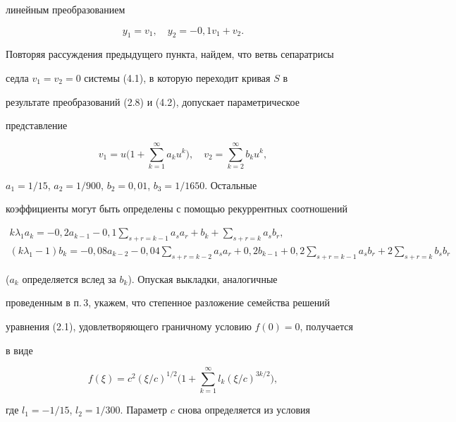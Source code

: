 линейным преобразованием 


\begin{equation} 


y_1=v_1,\quad y_2=-0{,}1v_1+v_2. 


\end{equation} 


Повторяя рассуждения предыдущего пункта, найдем, что ветвь сепаратрисы 


седла $v_1=v_2=0$ системы (4.1), в которую переходит кривая $S$ в 


результате преобразований (2.8) и (4.2), допускает параметрическое 


представление 


$$ 


v_1=u\bigg(1+\sum^\infty_{k=1}a_k u^k\bigg),\quad 


v_2=\sum^\infty_{k=2}b_k u^k, 


$$ 


$a_1=1/15$, $a_2=1/900$, $b_2=0{,}01$, $b_3=1/1650$. Остальные 


коэффициенты могут быть определены с помощью рекуррентных соотношений 


\begin{gather*} 


k\lambda_1a_k=-0{,}2a_{k-1}-0{,}1\sum_{s+r=k-1}a_s a_r+b_k 


+\sum_{s+r=k}a_s b_r,\\ 


(k\lambda_1-1)b_k=-0{,}08a_{k-2}-0{,}04\sum_{s+r=k-2} 


a_s a_r+0{,}2b_{k-1}+0{,}2\sum_{s+r=k-1}a_s b_r+ 


2\sum_{s+r=k}b_s b_r 


\end{gather*} 


($a_k$ определяется вслед за $b_k$). Опуская выкладки, аналогичные 


проведенным в п.\,3, укажем, что степенное разложение семейства решений 


уравнения (2.1), удовлетворяющего граничному условию $f(0)=0$, получается 


в виде 


$$ 


f(\xi)=c^2(\xi/c)^{1/2}\bigg(1+\sum^\infty_{k=1}l_k 


(\xi/c)^{3k/2}\bigg), 


$$ 


где $l_1=-1/15$, $l_2=1/300$. Параметр $c$ снова определяется из условия 


